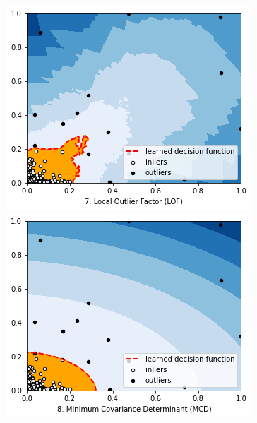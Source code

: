 \documentclass[12pt,twoside]{report}
\begin{document}
\begin{figure}[H]
\begin{multicols}{2}
    \includegraphics[width=\linewidth]{../code/figures/lof.png}\par 
    \includegraphics[width=\linewidth]{../code/figures/mcd.png}\par 
\end{multicols}
\label{fig:lof-mcd}
\end{figure}
\end{document}
